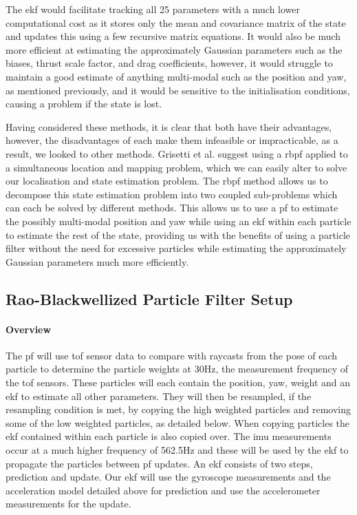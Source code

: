 \documentclass{report_template_oxford}
\begin{document}
The \gls{ekf} would facilitate tracking all 25 parameters with a much lower computational cost as it stores only the mean and covariance matrix of the state and updates this using a few recursive matrix equations. It would also be much more efficient at estimating the approximately Gaussian parameters such as the biases, thrust scale factor, and drag coefficients, however, it would struggle to maintain a good estimate of anything multi-modal such as the position and yaw, as mentioned previously, and it would be sensitive to the initialisation conditions, causing a problem if the state is lost.

Having considered these methods, it is clear that both have their advantages, however, the disadvantages of each make them infeasible or impracticable, as a result, we looked to other methods. Grisetti et al. \cite{RBPF} suggest using a \gls{rbpf} applied to a simultaneous location and mapping problem, which we can easily alter to solve our localisation and state estimation problem. The \gls{rbpf} method allows us to decompose this state estimation problem into two coupled sub-problems which can each be solved by different methods. This allows us to use a \gls{pf} to estimate the possibly multi-modal position and yaw while using an \gls{ekf} within each particle to estimate the rest of the state, providing us with the benefits of using a particle filter without the need for excessive particles while estimating the approximately Gaussian parameters much more efficiently.

\subsection{Rao-Blackwellized Particle Filter Setup}

\paragraph{Overview} The \gls{pf} will use \gls{tof} sensor data to compare with raycasts from the pose of each particle to determine the particle weights at 30Hz, the measurement frequency of the \gls{tof} sensors. These particles will each contain the position, yaw, weight and an \gls{ekf} to estimate all other parameters. They will then be resampled, if the resampling condition is met, by copying the high weighted particles and removing some of the low weighted particles, as detailed below. When copying particles the \gls{ekf} contained within each particle is also copied over. The \gls{imu} measurements occur at a much higher frequency of 562.5Hz and these will be used by the \gls{ekf} to propagate the particles between \gls{pf} updates. An \gls{ekf} consists of two steps, prediction and update. Our \gls{ekf} will use the gyroscope measurements and the acceleration model detailed above for prediction and use the accelerometer measurements for the update.
\end{document}
